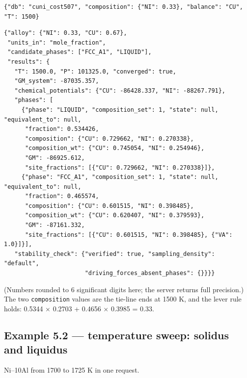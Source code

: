 \documentclass[12pt,a4paper]{article}
\begin{document}
\begin{lstlisting}[basicstyle={\footnotesize\ttfamily}]
{"db": "cuni_cost507", "composition": {"NI": 0.33}, "balance": "CU", "T": 1500}
\end{lstlisting}
\begin{lstlisting}[basicstyle={\footnotesize\ttfamily}]
{"alloy": {"NI": 0.33, "CU": 0.67},
 "units_in": "mole_fraction",
 "candidate_phases": ["FCC_A1", "LIQUID"],
 "results": {
   "T": 1500.0, "P": 101325.0, "converged": true,
   "GM_system": -87035.357,
   "chemical_potentials": {"CU": -86428.337, "NI": -88267.791},
   "phases": [
     {"phase": "LIQUID", "composition_set": 1, "state": null, "equivalent_to": null,
      "fraction": 0.534426,
      "composition": {"CU": 0.729662, "NI": 0.270338},
      "composition_wt": {"CU": 0.745054, "NI": 0.254946},
      "GM": -86925.612,
      "site_fractions": [{"CU": 0.729662, "NI": 0.270338}]},
     {"phase": "FCC_A1", "composition_set": 1, "state": null, "equivalent_to": null,
      "fraction": 0.465574,
      "composition": {"CU": 0.601515, "NI": 0.398485},
      "composition_wt": {"CU": 0.620407, "NI": 0.379593},
      "GM": -87161.332,
      "site_fractions": [{"CU": 0.601515, "NI": 0.398485}, {"VA": 1.0}]}],
   "stability_check": {"verified": true, "sampling_density": "default",
                       "driving_forces_absent_phases": {}}}}
\end{lstlisting}
(Numbers rounded to 6 significant digits here; the server returns full precision.) The two \texttt{composition} values are the tie-line ends at 1500 K, and the lever rule holds: 0.5344 \(\times\) 0.2703 + 0.4656 \(\times\) 0.3985 = 0.33.


\subsection*{Example 5.2 --- temperature sweep: solidus and liquidus}
Ni--10Al from 1700 to 1725 K in one request.
\end{document}
